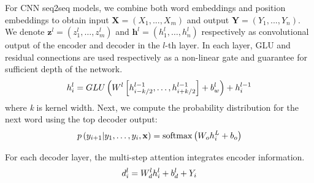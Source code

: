
For CNN seq2seq models, we combine both word embeddings and position embeddings to obtain input $\mathbf{X} = (X_1,...,X_m)$ and output $\mathbf{Y}=(Y_1,...,Y_n)$. 
We denote $\mathbf { z } ^ { l } = \left( z _ { 1 } ^ { l } , \ldots , z _ { m     } ^ { l } \right)$ and $\mathbf { h } ^ { l } = \left( h _ { 1 } ^ { l } , \ldots , h _ { n } ^ { l } \right)$ 
respectively as convolutional output of the encoder and
decoder in the $l$-th layer.
\DIFaddbegin {}\DIFaddend In each layer, GLU \cite{DauphinFAG17} and residual connections \cite{HeZRS16}
are used respectively as a non-linear gate and guarantee for sufficient depth of the network.  
\begin{equation}
\small
    h _ { i } ^ { l } = GLU \left( W ^ { l } \left[ h _ {i-k/2 } ^ { l - 1 } , \ldots , h _ { i+k/2 } ^ { l - 1 } \right] + b _ { w } ^ { l } \right) + h _ { i } ^ { l - 1 }
\end{equation} 
where \textit{k} is kernel width.
Next, we compute the probability distribution for the next word
using the top decoder output:
\begin{equation}
\small
    p \left( y _ { i + 1 } | y _ { 1 } , \ldots , y _ { i } , \mathbf { x } \right) = \operatorname { softmax } \left( W _ { o } h _ { i } ^ { L } + b _ { o } \right)
\end{equation}

For each decoder layer, the multi-step attention integrates encoder information. 
\DIFaddbegin {}\DIFaddend \begin{equation}
\small
    d _ { i } ^ { l } = W _ { d } ^ { l } h _ { i } ^ { l } + b _ { d } ^ { l } + Y _ { i }
\end{equation}

